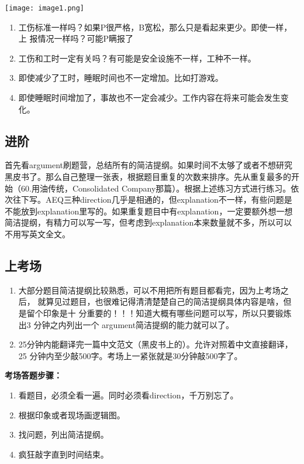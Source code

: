 \documentclass[cn,plain]{elegantbookex}
\begin{document}
\begin{center}
\texttt{[image: image1.png]}
\end{center}

\begin{enumerate}
    \item 工伤标准一样吗？如果P很严格，B宽松，那么只是看起来更少。即使一样，上
    报情况一样吗？可能P瞒报了
    \item 工伤和工时一定有关吗？有可能是安全设施不一样，工种不一样。
    \item 即使减少了工时，睡眠时间也不一定增加。比如打游戏。
    \item 即使睡眠时间增加了，事故也不一定会减少。工作内容在将来可能会发生变化。
\end{enumerate}

\subsection{进阶}
首先看argument刷题营，总结所有的简洁提纲。如果时间不太够了或者不想研究黑皮书了。那么自己整理一张表，根据题目重复的次数来排序。先从重复最多的开始（60.用油传统，Consolidated
Company那篇）。根据上述练习方式进行练习。依次往下写。AEQ三种direction几乎是相通的，但explanation不一样，有些问题是不能放到explanation里写的。如果重复题目中有explanation，一定要额外想一想简洁提纲，有精力可以写一写，但考虑到explanation本来数量就不多，所以可以不用写英文全文。

\subsection{上考场}
\begin{enumerate}
    \item 大部分题目简洁提纲比较熟悉，可以不用把所有题目都看完，因为上考场之后，
    就算见过题目，也很难记得清清楚楚自己的简洁提纲具体内容是啥，但是留个印象是十
    分重要的！！！知道大概有哪些问题可以写，所以只要锻炼出3 分钟之内列出一个
    argument简洁提纲的能力就可以了。
    \item 25分钟内能翻译完一篇中文范文（黑皮书上的）。允许对照着中文直接翻译，25
    分钟内至少敲500字。考场上一紧张就是30分钟敲500字了。
\end{enumerate}

\textbf{考场答题步骤：}
\begin{enumerate}
    \item 看题目，必须全看一遍。同时必须看direction，千万别忘了。
    \item 根据印象或者现场画逻辑图。
    \item 找问题，列出简洁提纲。
    \item 疯狂敲字直到时间结束。
\end{enumerate}
\end{document}
